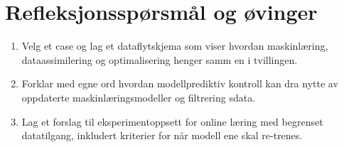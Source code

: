 \section{Refleksjonsspørsmål og øvinger}
\begin{enumerate}
    \item Velg et case og lag et dataflytskjema som viser hvordan maskinlæring, dataassimilering og optimalisering henger samm
en i tvillingen.
    \item Forklar med egne ord hvordan modellprediktiv kontroll kan dra nytte av oppdaterte maskinlæringsmodeller og filtrering
sdata.
    \item Lag et forslag til eksperimentoppsett for online læring med begrenset datatilgang, inkludert kriterier for når modell
ene skal re-trenes.
\end{enumerate}
